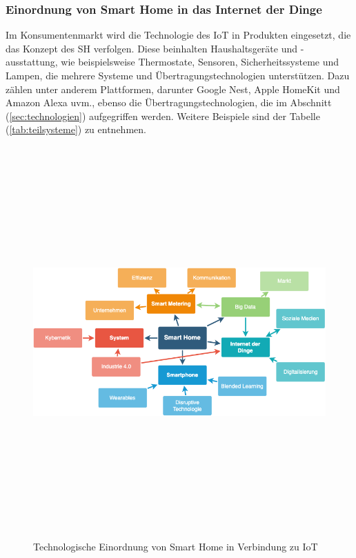     \subsubsection*{Einordnung von Smart Home in das Internet der Dinge}
    \label{subsubsec:smartHome-IoT}
        Im Konsumentenmarkt wird die Technologie des \acs{IoT} in Produkten eingesetzt, die 
        das Konzept des \acl{SH} verfolgen.  
        Diese beinhalten Haushaltsgeräte und -ausstattung, wie beispielsweise Thermostate, Sensoren, 
        Sicherheitssysteme und Lampen, die mehrere Systeme und Übertragungstechnologien 
        unterstützen. Dazu zählen unter anderem Plattformen, darunter Google Nest, Apple HomeKit 
        und Amazon Alexa uvm., ebenso die Übertragungstechnologien, die im Abschnitt (\ref{sec:technologien}) 
        aufgegriffen werden.
        Weitere Beispiele sind der Tabelle (\ref{tab:teilsysteme}) zu entnehmen. 
        \begin{figure}[hbt!]
            \centering
            \includegraphics[width=15cm,height=15cm,keepaspectratio]{images/SH-Mind_Map.png}
            \caption{Technologische Einordnung von Smart Home in Verbindung zu IoT \cite{shmindmap2021}}
            \label{pic:mindmap_SH-IoT}
        \end{figure}
